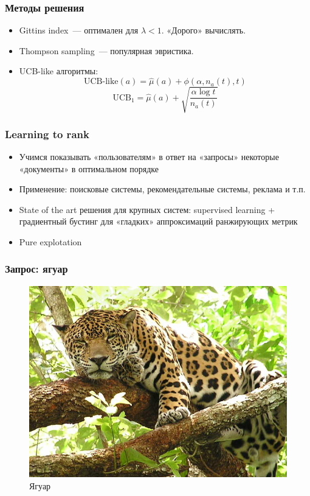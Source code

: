 \documentclass[xetex,mathserif,serif,table]{beamer}
\begin{document}
 

\begin{frame}
\frametitle{Методы решения}
\begin{itemize}
\item Gittins index —  оптимален для $\lambda < 1$. «Дорого» вычислять.
\item Thompson sampling — популярная эвристика. 
\item UCB-like алгоритмы:
$$\text{UCB-like}(a) = \hat{\mu}(a) + \phi(\alpha, n_a(t), t)$$ 
$$\text{UCB}_1 = \hat{\mu}(a) + \sqrt{\frac{\alpha \log t}{n_a(t)}}$$
\end{itemize}
\end{frame}

\begin{frame}
\frametitle{Learning to rank}
\begin{itemize}
\item Учимся показывать «пользователям» в ответ на «запросы»  некоторые «документы» в оптимальном порядке
\item Применение: поисковые системы, рекомендательные системы, реклама и т.п.
\item State of the art решения для крупных систем: supervised learning + градиентный бустинг для «гладких» аппроксимаций ранжирующих метрик
\item Pure explotation
\end{itemize}
\end{frame}



\begin{frame}
\frametitle{Запрос: ягуар}

\begin{figure}
  \centering
     \includegraphics[width=0.7\paperwidth]{img/jaguar1.jpg}
    \caption{Ягуар}
\end{figure}

\end{frame}
\end{document}
